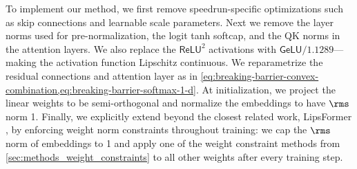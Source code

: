 To implement our method, we first remove speedrun-specific optimizations such as skip connections and learnable scale parameters. Next we remove the layer norms used for pre-normalization, the logit tanh softcap, and the QK norms in the attention layers. We also replace the $\mathsf{ReLU}^2$ activations with $\mathsf{GeLU}/1.1289$---making the activation function Lipschitz continuous. We reparametrize the residual connections and attention layer as in \cref{eq:breaking-barrier-convex-combination,eq:breaking-barrier-softmax-1-d}. At initialization, we project the linear weights to be semi-orthogonal and normalize the embeddings to have $\rms$ norm 1. Finally, we explicitly extend beyond the closest related work, LipsFormer \citep{qi2023lipsformer}, by enforcing weight norm constraints throughout training: we cap the $\rms$ norm of embeddings to 1 and apply one of the weight constraint methods from \cref{sec:methods_weight_constraints} to all other weights after every training step.

